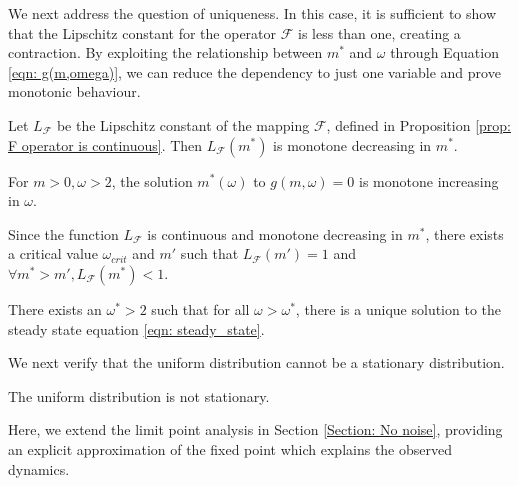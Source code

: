 \documentclass[10pt]{article}
\begin{document}
We next address the question of uniqueness. In this case, it is sufficient to show that the Lipschitz constant for the operator $\mathcal{F}$ is less than one, creating a contraction. By exploiting the relationship between $m^*$ and $\omega$ through Equation \eqref{eqn: g(m,omega)}, we can reduce the dependency to just one variable and prove monotonic behaviour.

\begin{lemma}\label{lem: L_F is monotone decreasing in m}
    Let $L_\mathcal{F}$ be the Lipschitz constant of the mapping $\mathcal{F}$,  defined in Proposition \ref{prop: F operator is continuous}. Then $L_\mathcal{F}(m^*)$ is monotone decreasing in $m^*$.
\end{lemma}


\begin{lemma}\label{lem: m(omega) is monotone increasing in omega}
    For $m>0,\omega>2$, the solution $m^*(\omega)$ to $g(m,\omega)=0$ is monotone increasing in $\omega$.
\end{lemma}

Since the function $L_\mathcal{F}$ is continuous and monotone decreasing in $m^*$, there exists a critical value $\omega_{crit}$ and $m'$ such that $L_\mathcal{F}(m') =1$ and $\forall m^* > m', L_\mathcal{F}(m^*) < 1$. 
\begin{theorem}\label{thm: unique fixed point}
    There exists an $\omega^*>2$ such that for all $\omega > \omega^*$, there is a unique solution to the steady state equation \eqref{eqn: steady_state}. 
\end{theorem}
We next verify that the uniform distribution cannot be a stationary distribution.
\begin{proposition}\label{prop: uniform is not stationary}
    The uniform distribution is not stationary.
\end{proposition}

Here, we extend the limit point analysis in Section \ref{Section: No noise}, providing an explicit approximation of the fixed point which explains the observed dynamics. 
\end{document}
